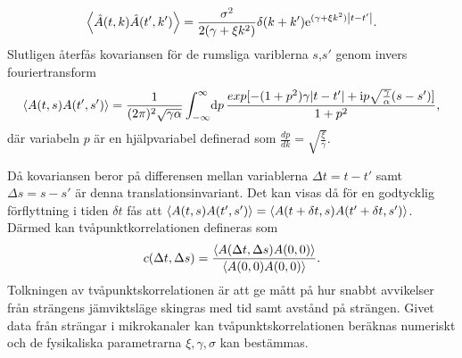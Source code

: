 \begin{equation}
    \ev{\hat{A}(t,k)\hat{A}(t',k')}=\frac{\sigma^2}{2(\gamma+\xi k^2)}\delta(k+k')\ee^{(\gamma+\xi k^2)\abs{t-t'}}.
\end{equation}
Slutligen återfås kovariansen för de rumsliga variblerna $s$,$s'$ genom invers fouriertransform
\begin{equation}
\label{2korr}
    \ev{A(t,s)A(t',s')}=\frac{1}{(2\pi)^2\sqrt{\gamma\alpha}}\int_{-\infty}^{\infty}\!\dd{p} \frac{exp[-(1+p^2)\gamma \abs{t-t'}+\ii p\sqrt{\frac{\gamma}{\alpha}}(s-s')]}{1+p^2},
\end{equation}
där variabeln $p$ är en hjälpvariabel definerad som $\frac{dp}{dk}=\sqrt{\frac{\xi}{\gamma}}$. 

Då kovariansen beror på differensen mellan variablerna $\Delta t=t-t'$ samt $\Delta s=s-s'$ är denna translationsinvariant. Det kan visas då för en godtycklig förflyttning i tiden $\delta{t}$ fås att $\ev{A(t,s)A(t',s')}=\ev{A(t+\delta t,s)A(t'+\delta t,s')}$. Därmed kan tvåpunktkorrelationen defineras som
\begin{equation}
    c(\Delta t,\Delta s)=\frac{\ev{A(\Delta t,\Delta s)A(0,0)}}{\ev{A(0,0)A(0,0)}}.
\end{equation}
Tolkningen av tvåpunktskorrelationen är att ge mått på hur snabbt avvikelser från strängens jämviktsläge skingras med tid samt avstånd på strängen. Givet data från strängar i mikrokanaler kan tvåpunktskorrelationen beräknas numeriskt och de fysikaliska parametrarna $\xi,\gamma,\sigma$ kan bestämmas. 

